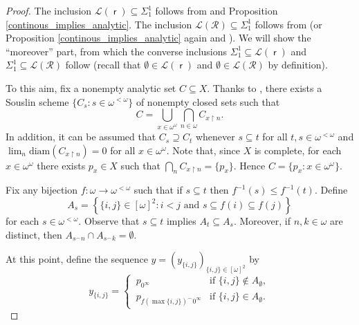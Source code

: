 \documentclass{amsart}
\theoremstyle{plain}
\theoremstyle{definition}
\theoremstyle{remark}
\DeclareMathOperator{\rr}{\mathsf{r}}
\begin{document}
\begin{proof}
The inclusion $\mathscr{L}(\rr)\subseteq\Sigma_1^1$ follows from \cite[Proposition 5.2(2)]{FKK23} and Proposition \ref{continous_implies_analytic}. The inclusion $\mathscr{L}(\mathcal{R})\subseteq\Sigma_1^1$ follows from \cite[Proposition~4.1]{MR3883171} (or Proposition \ref{continous_implies_analytic} again
and \cite[Proposition 5.2(5)]{FKK23}). We will show the ``moreover'' part, from which the converse inclusions $\Sigma_1^1\subseteq \mathscr{L}(\rr)$ and $\Sigma_1^1\subseteq \mathscr{L}(\mathcal{R})$ follow (recall that $\emptyset\in \mathscr{L}(\rr)$ and $\emptyset\in \mathscr{L}(\mathcal{R})$ by definition). 

To this aim, fix a nonempty analytic set $C\subseteq X$. 
Thanks to \cite[Theorem~25.7]{MR1321597}, there exists a Souslin scheme $\{C_s: s\in \omega^{<\omega}\}$ of nonempty closed sets such that 
\begin{equation}\label{eq:souslinscheme}
C = \bigcup_{x\in \omega^\omega}\bigcap_{n\in \omega}C_{x\restriction n}.
\end{equation}
In addition, it can be assumed that $C_s\supseteq C_t$ whenever $s\subseteq t$ for all $t,s\in \omega^{<\omega}$ and $\lim_n \mathrm{diam}(C_{x\restriction n})=0$ for all $x \in \omega^\omega$. 
Note that, since $X$ is complete, for each $x\in \omega^\omega$ there exists $p_x\in X$ such that 
$\bigcap_{n} C_{x\restriction n} = \{p_x\}$. 
Hence $C=\{p_x:x\in \omega^\omega\}$.


Fix any bijection $f:\omega\to\omega^{<\omega}$ such that if $s\subseteq t$ then $f^{-1}(s)\leq f^{-1}(t)$. Define 
\begin{equation*}
A_s=\left\{\{i,j\} \in [\omega]^2: i<j\text{ and }s\subseteq f(i)\subseteq f(j)\right\}
\end{equation*}
for each $s\in\omega^{<\omega}$. Observe that $s\subseteq t$ implies $A_t\subseteq A_s$. Moreover, if $n,k\in\omega$ are distinct, then $A_{s^\frown n}\cap A_{s^\frown k}=\emptyset$.

At this point, define the sequence $y=(y_{\{i,j\}})_{\{i,j\}\in[\omega]^2}$ by 
\begin{equation*}
y_{\{i,j\}}=\begin{cases}
    \,p_{0^\infty} &\text{if }\{i,j\}\notin A_\emptyset,\\
    \,p_{f(\max\{i,j\})^\frown 0^\infty} &\text{if }\{i,j\}\in A_\emptyset.
\end{cases}
\end{equation*}



\end{proof}
\end{document}
